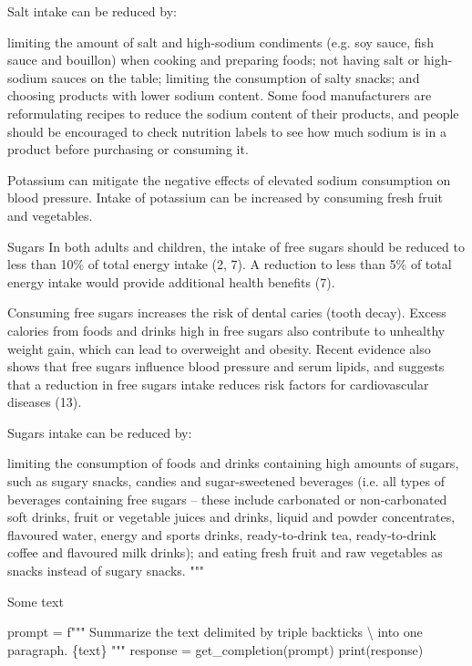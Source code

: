 \documentclass[
  letterpaper,
  DIV=11,
  numbers=noendperiod]{scrreprt}
\newenvironment{Shaded}{\begin{snugshade}}{\end{snugshade}}
\newcommand{\BuiltInTok}[1]{\textcolor[rgb]{0.00,0.23,0.31}{#1}}
\newcommand{\NormalTok}[1]{\textcolor[rgb]{0.00,0.23,0.31}{#1}}
\newcommand{\OperatorTok}[1]{\textcolor[rgb]{0.37,0.37,0.37}{#1}}
\newcommand{\SpecialCharTok}[1]{\textcolor[rgb]{0.37,0.37,0.37}{#1}}
\newcommand{\SpecialStringTok}[1]{\textcolor[rgb]{0.13,0.47,0.30}{#1}}
\newcommand{\StringTok}[1]{\textcolor[rgb]{0.13,0.47,0.30}{#1}}
\begin{document}
\begin{Shaded}
\begin{Highlighting}[]
\StringTok{Salt intake can be reduced by:}

\StringTok{limiting the amount of salt and high{-}sodium condiments (e.g. soy sauce, fish sauce and bouillon) when cooking and preparing foods;}
\StringTok{not having salt or high{-}sodium sauces on the table;}
\StringTok{limiting the consumption of salty snacks; and}
\StringTok{choosing products with lower sodium content.}
\StringTok{Some food manufacturers are reformulating recipes to reduce the sodium content of their products, and people should be encouraged to check nutrition labels to see how much sodium is in a product before purchasing or consuming it.}

\StringTok{Potassium can mitigate the negative effects of elevated sodium consumption on blood pressure. Intake of potassium can be increased by consuming fresh fruit and vegetables.}

\StringTok{Sugars}
\StringTok{In both adults and children, the intake of free sugars should be reduced to less than 10}\SpecialCharTok{\% o}\StringTok{f total energy intake (2, 7).  A reduction to less than 5}\SpecialCharTok{\% o}\StringTok{f total energy intake would provide additional health benefits (7).}

\StringTok{Consuming free sugars increases the risk of dental caries (tooth decay). Excess calories from foods and drinks high in free sugars also contribute to unhealthy weight gain, which can lead to overweight and obesity. Recent evidence also shows that free sugars influence blood pressure and serum lipids, and suggests that a reduction in free sugars intake reduces risk factors for cardiovascular diseases (13).}

\StringTok{Sugars intake can be reduced by:}

\StringTok{limiting the consumption of foods and drinks containing high amounts of sugars, such as sugary snacks, candies and sugar{-}sweetened beverages (i.e. all types of beverages containing free sugars – these include carbonated or non‐carbonated soft drinks, fruit or vegetable juices and drinks, liquid and powder concentrates, flavoured water, energy and sports drinks, ready‐to‐drink tea, ready‐to‐drink coffee and flavoured milk drinks); and}
\StringTok{eating fresh fruit and raw vegetables as snacks instead of sugary snacks.}
\StringTok{"""}
\end{Highlighting}
\end{Shaded}

Some text

\begin{Shaded}
\begin{Highlighting}[]
\NormalTok{prompt }\OperatorTok{=} \SpecialStringTok{f"""}
\SpecialStringTok{Summarize the text delimited by triple backticks \textbackslash{} }
\SpecialStringTok{into one paragraph.}
\SpecialStringTok{\textasciigrave{}\textasciigrave{}\textasciigrave{}}\SpecialCharTok{\{}\NormalTok{text}\SpecialCharTok{\}}\SpecialStringTok{\textasciigrave{}\textasciigrave{}\textasciigrave{}}
\SpecialStringTok{"""}
\NormalTok{response }\OperatorTok{=}\NormalTok{ get\_completion(prompt)}
\BuiltInTok{print}\NormalTok{(response)}
\end{Highlighting}
\end{Shaded}
\end{document}
